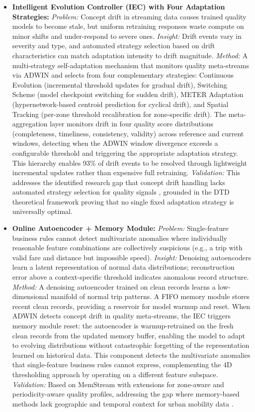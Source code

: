 \begin{itemize}
    \item \textbf{Intelligent Evolution Controller (IEC) with Four Adaptation Strategies:} \textit{Problem:} Concept drift in streaming data causes trained quality models to become stale, but uniform retraining responses waste compute on minor shifts and under-respond to severe ones. \textit{Insight:} Drift events vary in severity and type, and automated strategy selection based on drift characteristics can match adaptation intensity to drift magnitude. \textit{Method:} A multi-strategy self-adaptation mechanism that monitors quality meta-streams via ADWIN and selects from four complementary strategies: Continuous Evolution (incremental threshold updates for gradual drift), Switching Scheme (model checkpoint switching for sudden drift), METER Adaptation (hypernetwork-based centroid prediction for cyclical drift), and Spatial Tracking (per-zone threshold recalibration for zone-specific drift). The meta-aggregation layer monitors drift in four quality score distributions (completeness, timeliness, consistency, validity) across reference and current windows, detecting when the ADWIN window divergence exceeds a configurable threshold and triggering the appropriate adaptation strategy. This hierarchy enables 93\% of drift events to be resolved through lightweight incremental updates rather than expensive full retraining. \textit{Validation:} This addresses the identified research gap that concept drift handling lacks automated strategy selection for quality signals \cite{contextdq2022}, grounded in the DTD theoretical framework \cite{dtd2026} proving that no single fixed adaptation strategy is universally optimal.

    \item \textbf{Online Autoencoder + Memory Module:} \textit{Problem:} Single-feature business rules cannot detect multivariate anomalies where individually reasonable feature combinations are collectively suspicious (e.g., a trip with valid fare and distance but impossible speed). \textit{Insight:} Denoising autoencoders learn a latent representation of normal data distributions; reconstruction error above a context-specific threshold indicates anomalous record structure. \textit{Method:} A denoising autoencoder trained on clean records learns a low-dimensional manifold of normal trip patterns. A FIFO memory module stores recent clean records, providing a reservoir for model warmup and reset. When ADWIN detects concept drift in quality meta-streams, the IEC triggers memory module reset: the autoencoder is warmup-retrained on the fresh clean records from the updated memory buffer, enabling the model to adapt to evolving distributions without catastrophic forgetting of the representation learned on historical data. This component detects the multivariate anomalies that single-feature business rules cannot express, complementing the 4D thresholding approach by operating on a different feature subspace. \textit{Validation:} Based on MemStream \cite{bhatia2022memstream} with extensions for zone-aware and periodicity-aware quality profiles, addressing the gap where memory-based methods lack geographic and temporal context for urban mobility data \cite{contextdq2022}.
\end{itemize}

